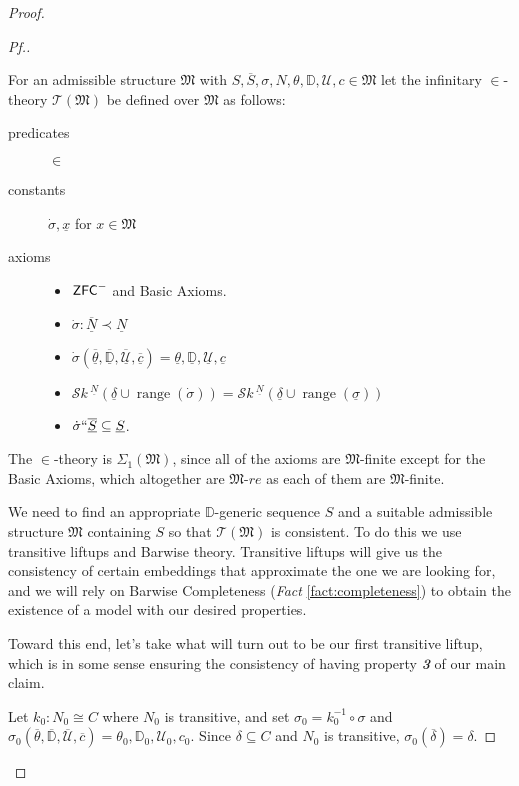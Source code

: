 \documentclass{amsart}
\theoremstyle{definition}
\theoremstyle{remark}
\newcommand{\D}{\mathbb{D}}
\newcommand{\U}{\mathcal{U}}
\newcommand{\ZFC}{\textup{\ensuremath{\textsf{ZFC}}}}
\DeclareMathOperator{\ran}{range}
\newcommand{\SH}{\mathcal{S}\textit{k} \,}
\newcommand{\sk}[3]{\SH^{#1}( {#2} \cup {\ran(#3)} ) }
\begin{document}
\begin{proof}
\begin{proof}[Pf.]
\begin{samepage}
For an admissible structure $\mathfrak M$ with $S, \overline S, \sigma, N, \theta, \D, \U, c \in \mathfrak M$ let the infinitary $\in$-theory $\mathcal T(\mathfrak M)$ be defined over $\mathfrak M$ as follows: 
\begin{description}
	\item[predicates] $\in$ 
	\item[constants] $\dot{\sigma}, \underline x$ for $x \in \mathfrak M$
	\item[axioms] \begin{itemize} \item $\ZFC^-$ and \textsf{Basic Axioms}.
		\item $\dot \sigma : \overline{\underline N} \prec \underline N$
		\item $\dot{\sigma}(\overline{\underline{\theta}}, \overline{\underline{\D}}, \overline{\underline{\U}}, \overline{\underline c})=\underline{\theta}, \underline{\D}, \underline{\U}, \underline{c}$
		\item $\sk{\underline N}{\underline{\delta}}{\dot \sigma} = \sk{\underline N}{\underline \delta}{\underline \sigma}$
		\item $\dot \sigma ``\overline{\underline S} \subseteq \underline S$.
	\end{itemize}
\end{description}
\end{samepage}

The $\in$-theory is $\Sigma_1(\mathfrak M)$, since all of the axioms are $\mathfrak M$-finite except for the \textsf{Basic Axioms}, which altogether are $\mathfrak M$-$re$ as each of them are $\mathfrak M$-finite.

We need to find an appropriate $\D$-generic sequence $S$ and a suitable admissible structure $\mathfrak M$ containing $S$ so that $\mathcal T(\mathfrak M)$ is consistent. To do this we use transitive liftups and Barwise theory. Transitive liftups will give us the consistency of certain embeddings that approximate the one we are looking for, and we will rely on Barwise Completeness (\textit{Fact} \ref{fact:completeness}) to obtain the existence of a model with our desired properties. 

Toward this end, let's take what will turn out to be our first transitive liftup, which is in some sense ensuring the consistency of having property \textsl{\textbf{3}} of our main claim.

Let $k_0 : N_0 \cong C$ where $N_0$ is transitive, and set $\sigma_0 = k_0^{-1} \circ \sigma$ and $\sigma_0(\overline \theta, \overline{\D}, \overline{\U}, \overline c) = \theta_0, \D_0, \U_0, c_0.$
Since $\delta \subseteq C$ and $N_0$ is transitive, $\sigma_0(\overline \delta)=\delta$. 


\end{proof}
\end{proof}
\end{document}
